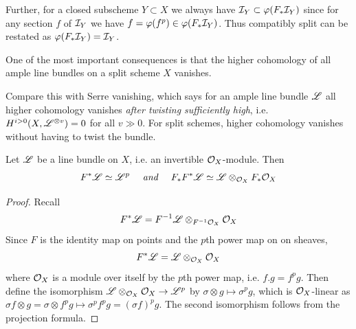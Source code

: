 \documentclass[12pt]{article}
\begin{document}
    Further, for a closed subscheme $Y \subset X$ we always have $\mathcal{I}_Y \subset \varphi(F_* \mathcal{I}_Y)$ since for any section $f$ of $\mathcal{I}_Y$ we have $f = \varphi(f^p) \in \varphi(F_*\mathcal{I}_Y)$. Thus compatibly split can be restated as $\varphi(F_* \mathcal{I}_Y) = \mathcal{I}_Y$.

One of the most important consequences is that the higher cohomology of all ample line bundles on a split scheme $X$ vanishes. 

Compare this with Serre vanishing, which says for an ample line bundle $\mathscr{L}$ all higher cohomology vanishes \textit{after twisting sufficiently high}, i.e. $H^{i > 0}(X,\mathscr{L}^{\otimes v}) = 0$ for all $v \gg 0$. For split schemes, higher cohomology vanishes without having to twist the bundle.

\begin{lem}\label{bklem1.2.6}
    Let $\mathscr{L}$ be a line bundle on $X$, i.e. an invertible $\mathcal{O}_X$-module. Then
    \[F^* \mathscr{L} \simeq \mathscr{L}^p \quad\textit{ and }\quad F_*F^* \mathscr{L} \simeq \mathscr{L} \otimes_{\mathcal{O}_X} F_* \mathcal{O}_X \]
\end{lem}
\begin{proof}
    Recall
    \[F^* \mathscr{L} = F^{-1} \mathscr{L} \otimes_{F^{-1} \mathcal{O}_X} \mathcal{O}_X\]
    Since $F$ is the identity map on points and the $p$th power map on on sheaves, 
    \[F^* \mathscr{L} = \mathscr{L} \otimes_{\mathcal{O}_X} \mathcal{O}_X\]
    where $\mathcal{O}_X$ is a module over itself by the $p$th power map, i.e. $f.g = f^pg$. Then define the isomorphism $\mathscr{L} \otimes_{\mathcal{O}_X} \mathcal{O}_X \rightarrow \mathscr{L}^p$ by $\sigma \otimes g \mapsto \sigma^p g$, which is $\mathcal{O}_X$-linear as $\sigma f \otimes g = \sigma \otimes f^p g \mapsto \sigma^p f^p g = (\sigma f)^p g$. The second isomorphism follows from the projection formula.
\end{proof}
\end{document}
